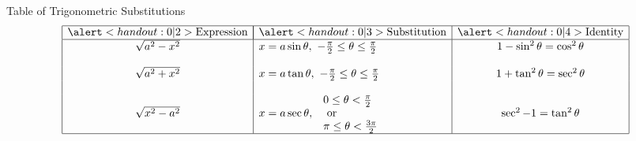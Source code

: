 \begin{frame}
Table of Trigonometric Substitutions
\[
\begin{array}{|c|l|c|}
\hline
\alert<handout:0| 2>{\text{Expression}} & \multicolumn{1}{|c|}{\alert<handout:0| 3>{\text{Substitution}}} & \alert<handout:0| 4>{\text{Identity}}\\
\hline
\sqrt{a^2-x^2} & x = a\sin \theta , \ -\frac{\pi}{2} \leq \theta \leq \frac{\pi}{2} & 1 - \sin^2 \theta = \cos^2 \theta\\&&\\
\sqrt{a^2+x^2} & x = a\tan \theta , \ -\frac{\pi}{2} \leq \theta \leq \frac{\pi}{2} & 1 + \tan^2 \theta = \sec^2 \theta\\&&\\
\sqrt{x^2-a^2} & x = a\sec \theta , \  \begin{array}{l}0 \leq \theta < \frac{\pi}{2} \\ \text{  or} \\ \pi \leq \theta < \frac{3\pi}{2}\end{array} & \sec^2 - 1 = \tan^2  \theta\\
\hline
\end{array}
\]
%
\end{frame}
